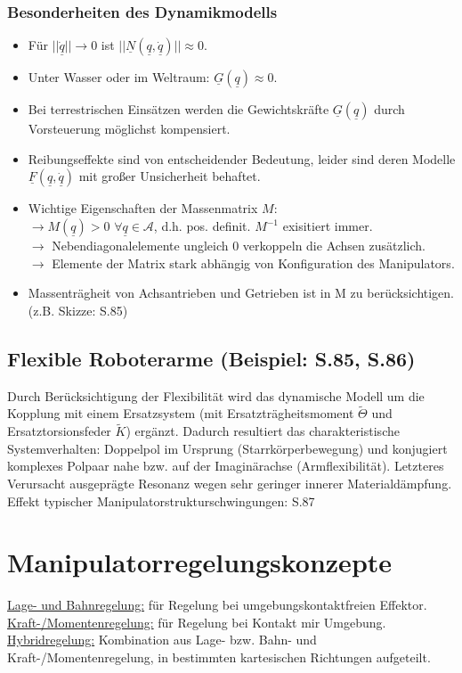 \documentclass[a4paper,landscape,6pt]{article}
\newcommand{\ul}[1]{\underline{#1}}
\begin{document}
\begin{multicols}{3}
\subsubsection*{Besonderheiten des Dynamikmodells}
\begin{itemize}
	\item Für $||\ul{\dot q}|| \rightarrow 0$ ist $||\ul N (\ul q, \ul{\dot q})|| \approx 0$.
	\item Unter Wasser oder im Weltraum: $\ul G (\ul q) \approx 0$.
	\item Bei terrestrischen Einsätzen werden die Gewichtskräfte $\ul G (\ul q)$ durch Vorsteuerung möglichst kompensiert.
	\item Reibungseffekte sind von entscheidender Bedeutung, leider sind deren Modelle $\ul F(\ul q, \ul{\dot q})$ mit großer Unsicherheit behaftet.
	\item Wichtige Eigenschaften der Massenmatrix $M$:\\
	$\rightarrow M(\ul q) > 0$ $ \forall \ul q \in \mathcal{A}$, d.h. pos. definit. $M^{-1}$ exisitiert immer.\\
	$\rightarrow$ Nebendiagonalelemente ungleich 0 verkoppeln die Achsen zusätzlich.\\
	$\rightarrow$ Elemente der Matrix stark abhängig von Konfiguration des Manipulators.
	\item Massenträgheit von Achsantrieben und Getrieben ist in M zu berücksichtigen. (z.B. Skizze: S.85)
\end{itemize}
\subsection*{Flexible Roboterarme \footnotesize{(Beispiel: S.85, S.86)}}
Durch Berücksichtigung der Flexibilität wird das dynamische Modell um die Kopplung mit einem Ersatzsystem (mit Ersatzträgheitsmoment $\tilde \Theta$ und Ersatztorsionsfeder $\tilde K$) ergänzt. Dadurch resultiert das charakteristische Systemverhalten: Doppelpol im Ursprung (Starrkörperbewegung) und konjugiert komplexes Polpaar nahe bzw. auf der Imaginärachse (Armflexibilität). Letzteres Verursacht ausgeprägte Resonanz wegen sehr geringer innerer Materialdämpfung.\\

Effekt typischer Manipulatorstrukturschwingungen: S.87
\section{Manipulatorregelungskonzepte}
\ul{Lage- und Bahnregelung:} für Regelung bei umgebungskontaktfreien Effektor.\\
\ul{Kraft-/Momentenregelung:} für Regelung bei Kontakt mir Umgebung.\\
\ul{Hybridregelung:} Kombination aus Lage- bzw. Bahn- und Kraft-/Momentenregelung, in bestimmten kartesischen Richtungen aufgeteilt.

\end{multicols}
\end{document}
